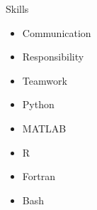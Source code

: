\documentclass{resume} %
\begin{document}
\begin{rSection}{Skills}

  \begin{multicols}{4}
    \begin{itemize}
    \setlength\itemsep{-0.75em}
    \item Communication
    \item Responsibility
    \item Teamwork
    \item Python
    \item MATLAB
    \item R
    \item Fortran
    \item Bash
    \end{itemize}
  \end{multicols}
    
\end{rSection}

\end{document}
